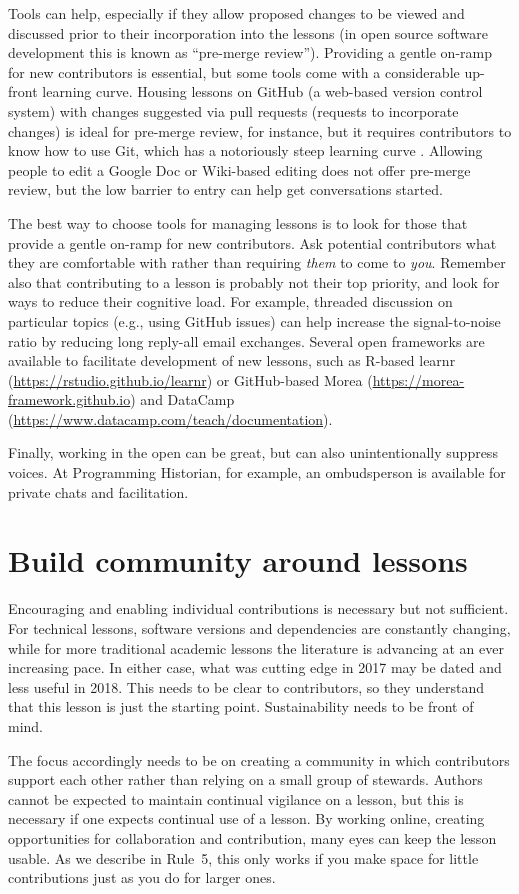 \documentclass[10pt,letterpaper]{article}
\newcommand{\rulemajor}[1]{\section{#1}}
\begin{document}
Tools can help,
especially if they allow proposed changes to be viewed and discussed
prior to their incorporation into the lessons
(in open source software development this is known as ``pre-merge review'').
Providing a gentle on-ramp for new contributors is essential,
but some tools come with a considerable up-front learning curve.
Housing lessons on GitHub (a web-based version control system)
with changes suggested via pull requests (requests to incorporate changes) is
ideal for pre-merge review, for instance,
but it requires contributors to know how to use Git,
which has a notoriously steep learning curve \cite{git-survey}.
Allowing people to edit a Google Doc or Wiki-based editing does not offer pre-merge review,
but the low barrier to entry can help get conversations started.

The best way to choose tools for managing lessons
is to look for those that provide a gentle on-ramp for new contributors.
Ask potential contributors what they are comfortable with
rather than requiring \emph{them} to come to \emph{you}.
Remember also that contributing to a lesson is probably not their top priority,
and look for ways to reduce their cognitive load.
For example,
threaded discussion on particular topics (e.g., using GitHub issues)
can help increase the signal-to-noise ratio
by reducing long reply-all email exchanges.
Several open frameworks are available to facilitate
development of new lessons, such as R-based
learnr (\url{https://rstudio.github.io/learnr}) or
GitHub-based Morea (\url{https://morea-framework.github.io}) and
DataCamp (\url{https://www.datacamp.com/teach/documentation}).

Finally,
working in the open can be great,
but can also unintentionally suppress voices.
At Programming Historian,
for example,
an ombudsperson is available for private chats and facilitation.

\rulemajor{Build community around lessons}

Encouraging and enabling individual contributions is necessary but not sufficient.
For technical lessons,
software versions and dependencies are constantly changing,
while for more traditional academic lessons the literature is advancing at an ever increasing pace.
In either case,
what was cutting edge in 2017 may be dated and less useful in 2018.
This needs to be clear to contributors,
so they understand that this lesson is just
the starting point.
Sustainability needs to be front of mind.

The focus accordingly needs to be on creating a community in which contributors support each other
rather than relying on a small group of stewards.
Authors cannot be expected to maintain continual vigilance on a lesson,
but this is necessary if one expects continual use of a lesson.
By working online, creating opportunities for collaboration
and contribution, many eyes can keep the lesson usable.
As we describe in Rule~5,
this only works if you make space for
little contributions just as you do for larger ones.
\end{document}
